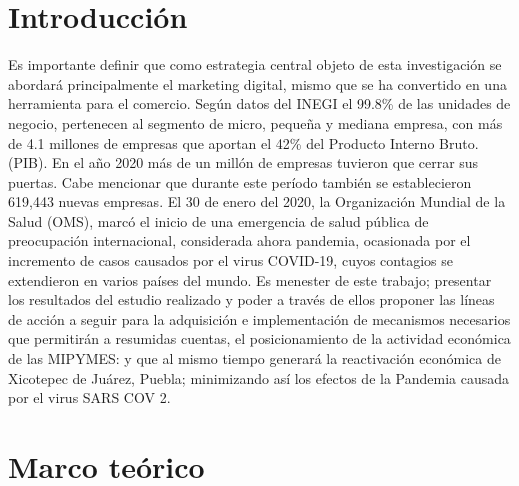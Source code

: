 \documentclass[12pt]{difu100cia} %
\begin{document}
\section{Introducción}
Es importante definir que como estrategia central objeto de esta investigación se abordará principalmente el marketing digital, mismo que se ha convertido en una herramienta para el comercio.
Según datos del INEGI el 99.8\% de las unidades de negocio, pertenecen al segmento de micro, pequeña y mediana empresa, con más de 4.1 millones de empresas que aportan el 42\% del Producto Interno Bruto. (PIB).
En el año 2020 más de un millón de empresas tuvieron que cerrar sus puertas. Cabe mencionar que durante este período también se establecieron 619,443 nuevas empresas.
El 30 de enero del 2020, la Organización Mundial de la Salud (OMS), marcó el inicio de una emergencia de salud pública de preocupación internacional, considerada ahora pandemia, ocasionada por el incremento de casos causados por el virus COVID-19, cuyos contagios se extendieron en varios países del mundo.
Es menester de este trabajo; presentar los resultados del estudio realizado y poder a través de ellos proponer las líneas de acción a seguir para la adquisición e implementación de mecanismos necesarios que permitirán a resumidas cuentas, el posicionamiento de la actividad económica de las MIPYMES: y que al mismo tiempo generará la reactivación económica de Xicotepec de Juárez, Puebla; minimizando así los efectos de la Pandemia causada por el virus SARS COV 2.


\section{Marco teórico}
\end{document}
